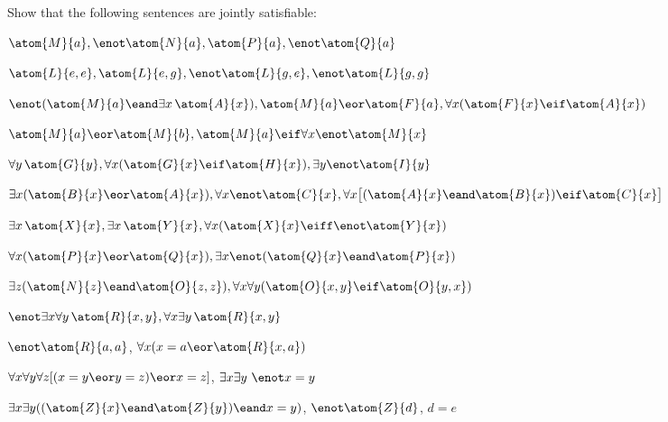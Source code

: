 \problempart
Show that the following sentences are jointly satisfiable:
\begin{compactlist}
\item  $\atom{M}{a}, \enot \atom{N}{a}, \atom{P}{a}, \enot \atom{Q}{a}$
\item $\atom{L}{e,e}, \atom{L}{e,g}, \enot \atom{L}{g,e}, \enot \atom{L}{g,g}$
\item $\enot (\atom{M}{a} \eand \exists x\, \atom{A}{x}), \atom{M}{a} \eor \atom{F}{a}, \forall x(\atom{F}{x} \eif \atom{A}{x})$
\item $\atom{M}{a} \eor \atom{M}{b}, \atom{M}{a} \eif \forall x \enot \atom{M}{x}$
\item $\forall y\, \atom{G}{y}, \forall x (\atom{G}{x} \eif \atom{H}{x}), \exists y \enot \atom{I}{y}$
\item $\exists x(\atom{B}{x} \eor \atom{A}{x}), \forall x \enot \atom{C}{x}, \forall x\bigl[(\atom{A}{x} \eand \atom{B}{x}) \eif \atom{C}{x}\bigr]$
\item $\exists x\, \atom{X}{x}, \exists x\, \atom{Y}{x}, \forall x(\atom{X}{x} \eiff \enot \atom{Y}{x})$
\item $\forall x(\atom{P}{x} \eor \atom{Q}{x}), \exists x\enot(\atom{Q}{x} \eand \atom{P}{x})$
\item $\exists z(\atom{N}{z} \eand \atom{O}{z,z}), \forall x\forall y(\atom{O}{x,y} \eif \atom{O}{y,x})$
\item $\enot \exists x \forall y\, \atom{R}{x,y}, \forall x \exists y\, \atom{R}{x,y}$
\item $\enot \atom{R}{a,a}$, $\forall x (x=a \eor \atom{R}{x,a})$
\item $\forall x\forall y\forall z[(x=y \eor y=z )\eor x=z]$, $\exists x\exists y\ \enot x= y$
\item $\exists x\exists y((\atom{Z}{x} \eand \atom{Z}{y} )\eand x=y)$, $\enot \atom{Z}{d}$, $d=e$
\end{compactlist}

